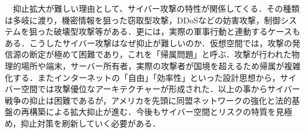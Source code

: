\documentclass[uplatex,twocolumn,dvipdfmx]{jsarticle}
\begin{document}
　抑止拡大が難しい理由として、サイバー攻撃の特性が関係してくる．その種類は多岐に渡り，機密情報を狙った窃取型攻撃，DDoSなどの妨害攻撃，制御システムを狙った破壊型攻撃等がある．更には，実際の軍事行動と連動するケースもある．こうしたサイバー攻撃はなぜ抑止が難しいのか．仮想空間では，攻撃の発信源の断定が極めて困難であり，これを「帰属問題」と呼ぶ．攻撃が行われた物理的場所や端末，サーバー所有者，実際の攻撃者が国境を超えるため帰属が複雑化する．またインターネットの「自由」「効率性」といった設計思想から，サイバー空間では攻撃優位なアーキテクチャーが形成された．以上の事からサイバー戦争の抑止は困難であるが，アメリカを先頭に同盟ネットワークの強化と法的基盤の再構築による拡大抑止が進む．今後もサイバー空間とリスクの特質を見極め，抑止対策を刷新していく必要がある．




\end{document}
